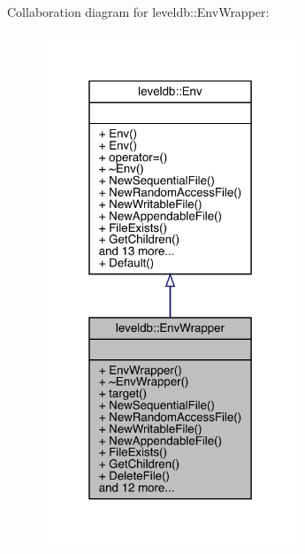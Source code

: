 Collaboration diagram for leveldb\+::Env\+Wrapper\+:
\nopagebreak
\begin{figure}[H]
\begin{center}
\leavevmode
\includegraphics[width=217pt]{classleveldb_1_1_env_wrapper__coll__graph}
\end{center}
\end{figure}
